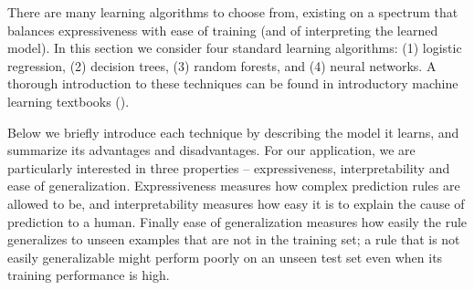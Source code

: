 %
%

There are many learning algorithms to choose from, existing
on a spectrum that balances expressiveness with ease of training (and of
interpreting the learned model). In this section we consider four standard learning algorithms: (1) logistic regression, (2) decision trees, (3) random forests, and (4) neural networks. A thorough introduction to these techniques can be found in introductory
machine learning textbooks (\eg \cite{FriedmanHastieTibshirani2000}).
%

Below we briefly introduce each technique by describing the model it learns, and summarize its advantages and disadvantages. For our application, we are particularly interested in three properties -- expressiveness, interpretability and ease of generalization. Expressiveness measures how complex prediction rules are allowed to be, and interpretability measures how easy it is to explain the cause of prediction to a human. Finally ease of generalization measures how easily the rule generalizes to unseen examples that are not in the training set; a rule that is not easily generalizable might perform poorly on an unseen test set even when its training performance is high.


 

